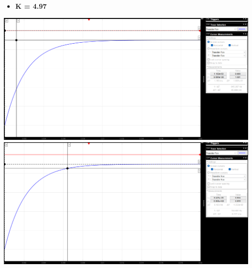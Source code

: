 \documentclass[12pt]{article}
\begin{document}
\begin{itemize}
    \item \bf \large K = 4.97
\end{itemize}
\begin{center}
    \includegraphics[width = 16 cm]{TP2 Simulink/Syst_1/Erreur statique_syst_1_K=4.97.png}
    \includegraphics[width = 16 cm]{TP2 Simulink/Syst_1/Reponse_indic_syst_1_K=4.97_tr5prct.png}

\end{center}
\end{document}
